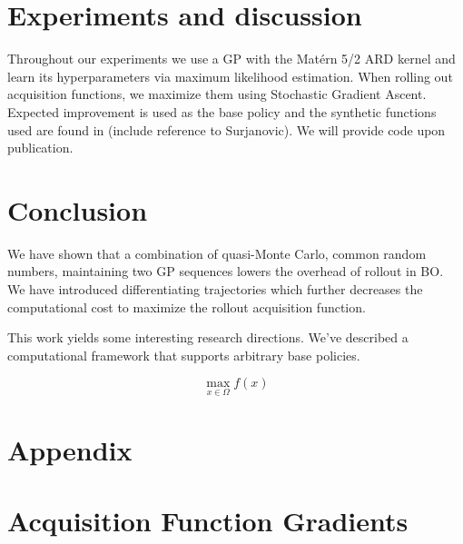 \documentclass{article}
\begin{document}
\section{Experiments and discussion}
Throughout our experiments we use a GP with the Matérn 5/2 ARD kernel and learn its hyperparameters
via maximum likelihood estimation. When rolling out acquisition functions, we maximize them using
Stochastic Gradient Ascent. Expected improvement is used as the base policy and the synthetic
functions used are found in (include reference to Surjanovic). We will provide code upon publication.

\section{Conclusion}
We have shown that a combination of quasi-Monte Carlo, common random numbers, maintaining two GP sequences
lowers the overhead of rollout in BO. We have introduced differentiating trajectories which further decreases
the computational cost to maximize the rollout acquisition function.

This work yields some interesting research directions. We've described a computational framework that supports
arbitrary base policies.

\begin{equation}
    \max_{x \in \Omega} f(x)
\end{equation}


\small
\nocite{*}


\section*{Appendix}


\appendix

\section{Acquisition Function Gradients}
\end{document}
